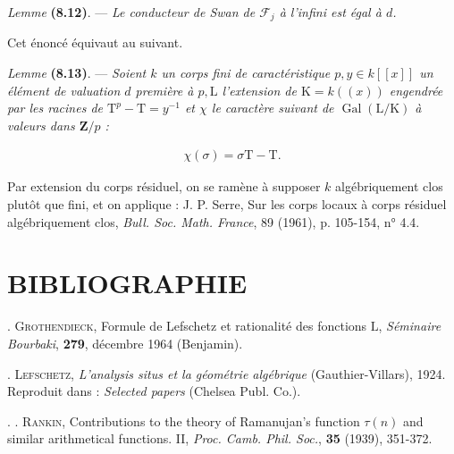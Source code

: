 \documentclass[10pt,leqno]{article}
\begin{document}
\noindent \emph{Lemme} \textbf{(8.12)}. — {\itshape Le conducteur de Swan de \(\mathcal{F} _{j}\) à l'infini est égal à \(d\).}\par

\noindent Cet énoncé équivaut au suivant.\par

\noindent \emph{Lemme} \textbf{(8.13)}. — {\itshape Soient \(k\) un corps fini de caractéristique \(p, y \in  k[[x]]\) un élément de valuation \(d\) première à \(p, \mathrm{L}\) l'extension de \(\mathrm{K} = k((x))\) engendrée par les racines de \(\mathrm{T}^{p}-\mathrm{T} = y^{-1}\) et \(\chi \) le caractère suivant de \(\operatorname{Gal}(\mathrm{L}/\mathrm{K})\) à valeurs dans \(\mathbf{Z}/p\) :}\par

\begin{equation*}\begin{gathered}\chi (\sigma ) = \sigma \mathrm{T}-\mathrm{T}.\end{gathered}\end{equation*}

\par

\noindent Par extension du corps résiduel, on se ramène à supposer \(k\) algébriquement clos plutôt que fini, et on applique : J. P. Serre, Sur les corps locaux à corps résiduel algébriquement clos, \emph{Bull. Soc. Math. France}, 89 (1961), p. 105-154, n° 4.4.\par

\section*{BIBLIOGRAPHIE}

\noindent [\(1] \). \textsc{Grothendieck}, Formule de Lefschetz et rationalité des fonctions \(\mathrm{L}\), \emph{Séminaire Bourbaki}, \textbf{279}, décembre 1964 (Benjamin).\par

\noindent [\(2] \). \textsc{Lefschetz}, \emph{L'analysis situs et la géométrie algébrique} (Gauthier-Villars), 1924. Reproduit dans : \emph{Selected papers} (Chelsea Publ. Co.).\par

\noindent [\(3] . \). \textsc{Rankin}, Contributions to the theory of Ramanujan's function \(\tau (n)\) and similar arithmetical functions. II, \emph{Proc. Camb. Phil. Soc.}, \textbf{35} (1939), 351-372.\par
\end{document}
